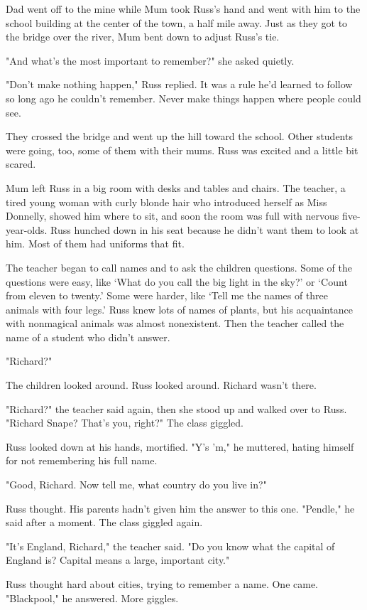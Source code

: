 Dad went off to the mine while Mum took Russ's hand and went with him to the school building at the center of the town, a half mile away. Just as they got to the bridge over the river, Mum bent down to adjust Russ's tie.

"And what's the most important to remember?" she asked quietly.

"Don't make nothing happen," Russ replied. It was a rule he'd learned to follow so long ago he couldn't remember. Never make things happen where people could see.

They crossed the bridge and went up the hill toward the school. Other students were going, too, some of them with their mums. Russ was excited and a little bit scared.

Mum left Russ in a big room with desks and tables and chairs. The teacher, a tired young woman with curly blonde hair who introduced herself as Miss Donnelly, showed him where to sit, and soon the room was full with nervous five-year-olds. Russ hunched down in his seat because he didn't want them to look at him. Most of them had uniforms that fit.

The teacher began to call names and to ask the children questions. Some of the questions were easy, like `What do you call the big light in the sky?' or `Count from eleven to twenty.' Some were harder, like `Tell me the names of three animals with four legs.' Russ knew lots of names of plants, but his acquaintance with nonmagical animals was almost nonexistent. Then the teacher called the name of a student who didn't answer.

"Richard?"

The children looked around. Russ looked around. Richard wasn't there.

"Richard?" the teacher said again, then she stood up and walked over to Russ. "Richard Snape? That's you, right?" The class giggled.

Russ looked down at his hands, mortified. "Y's 'm," he muttered, hating himself for not remembering his full name.

"Good, Richard. Now tell me, what country do you live in?"

Russ thought. His parents hadn't given him the answer to this one. "Pendle," he said after a moment. The class giggled again.

"It's England, Richard," the teacher said. "Do you know what the capital of England is? Capital means a large, important city."

Russ thought hard about cities, trying to remember a name. One came. "Blackpool," he answered. More giggles.

